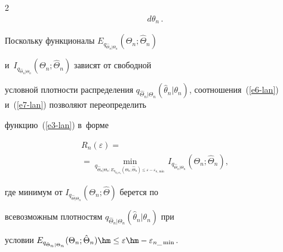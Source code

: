 \begin{multicols}{2}
\begin{multline}
d\theta_n\,.\!\!


\label{e7-lan}


\end{multline}





\vspace*{-3pt}





\noindent


Поскольку функционалы $E_{q_{\hat{\Theta}_n\vert \Theta_n}} (\Theta_n; \hat{\Theta}_n)$ 


и~$I_{q_{\hat{\Theta}_n\vert \Theta_n }} (\Theta_n; \hat{\Theta}_n)$ зависят от свободной 


условной плотности распределения $q_{\hat{\Theta}_n\vert\Theta_n} (\hat{\theta}_n\vert 


\theta_n)$, соотношения~(\ref{e6-lan}) и~(\ref{e7-lan}) поз\-во\-ля\-ют переопределить 


функцию~(\ref{e3-lan}) в~форме 





\noindent


\begin{multline}


R_n(\varepsilon) ={}\\


\!{}=\!\!\min\limits_{q_{\hat{\Theta}_n\vert \Theta_n: E_{q_{\hat{\Theta}_n\vert 


\Theta_n}} (\Theta_n;\hat{\Theta}_n)\leq \varepsilon -\varepsilon_{n\_\min}}} \!\!I_{q_{\hat{\Theta}_n\vert \Theta_n}}(\Theta_n;\hat{\Theta}_n),\!


\label{e8-lan} 


\end{multline}


где минимум от $I_{q_{\hat{\Theta}\vert \Theta_n}}(\Theta_n; \hat{\Theta})$ берется по 


всевозможным плотностям $q_{\hat{\Theta}_n\vert \Theta_n} (\hat{\theta}_n\vert \theta_n)$ при 


условии  $E_{q_{\hat{\Theta}_n\vert \Theta_n}}(\Theta_n; \hat{\Theta}_n)\hm\leq \varepsilon\hm- 


\varepsilon_{n\_\min}$.





\smallskip






\end{multicols}

